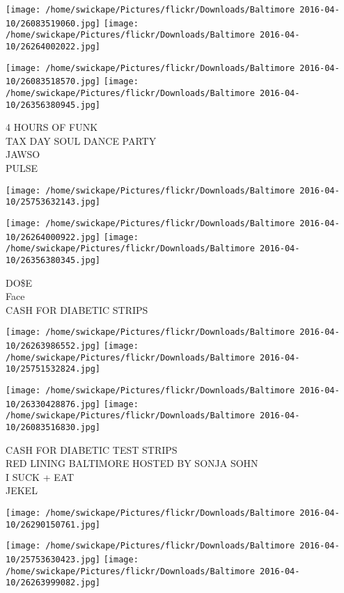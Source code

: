 \documentclass[10pt,letterpaper]{article}
\begin{document}
\texttt{[image: /home/swickape/Pictures/flickr/Downloads/Baltimore 2016-04-10/26083519060.jpg]}
\texttt{[image: /home/swickape/Pictures/flickr/Downloads/Baltimore 2016-04-10/26264002022.jpg]}

\texttt{[image: /home/swickape/Pictures/flickr/Downloads/Baltimore 2016-04-10/26083518570.jpg]}
\texttt{[image: /home/swickape/Pictures/flickr/Downloads/Baltimore 2016-04-10/26356380945.jpg]}

4 HOURS OF FUNK\\
TAX DAY SOUL DANCE PARTY\\
JAWSO\\
PULSE
\pagebreak

\texttt{[image: /home/swickape/Pictures/flickr/Downloads/Baltimore 2016-04-10/25753632143.jpg]}

\vspace{0.25in}
\texttt{[image: /home/swickape/Pictures/flickr/Downloads/Baltimore 2016-04-10/26264000922.jpg]}
\texttt{[image: /home/swickape/Pictures/flickr/Downloads/Baltimore 2016-04-10/26356380345.jpg]}

DO\$E\\
Face\\
CASH FOR DIABETIC STRIPS
\pagebreak

\texttt{[image: /home/swickape/Pictures/flickr/Downloads/Baltimore 2016-04-10/26263986552.jpg]}
\texttt{[image: /home/swickape/Pictures/flickr/Downloads/Baltimore 2016-04-10/25751532824.jpg]}

\texttt{[image: /home/swickape/Pictures/flickr/Downloads/Baltimore 2016-04-10/26330428876.jpg]}
\texttt{[image: /home/swickape/Pictures/flickr/Downloads/Baltimore 2016-04-10/26083516830.jpg]}

CASH FOR DIABETIC TEST STRIPS\\
RED LINING BALTIMORE HOSTED BY SONJA SOHN\\
I SUCK + EAT\\
JEKEL
\pagebreak

\texttt{[image: /home/swickape/Pictures/flickr/Downloads/Baltimore 2016-04-10/26290150761.jpg]}

\vspace{0.25in}
\texttt{[image: /home/swickape/Pictures/flickr/Downloads/Baltimore 2016-04-10/25753630423.jpg]}
\texttt{[image: /home/swickape/Pictures/flickr/Downloads/Baltimore 2016-04-10/26263999082.jpg]}
\end{document}
